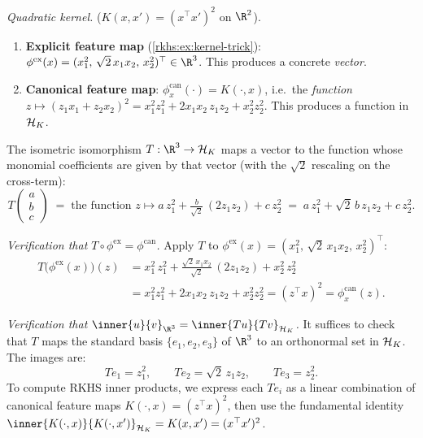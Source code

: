 \begin{notechapter}
\begin{intuition}
\medskip
\emph{Quadratic kernel.}
($K(x,x') = (x^\top x')^2$ on $\R^2$).
\begin{enumerate}
  \item \textbf{Explicit feature map}
    (\cref{rkhs:ex:kernel-trick}):
    $\phi^{\mathrm{ex}}(x) =
    (x_1^2,\, \sqrt{2}\,x_1 x_2,\, x_2^2)^\top
    \in \R^3$.
    This produces a concrete \emph{vector}.
  \item \textbf{Canonical feature map}:
    $\phi_x^{\mathrm{can}}(\cdot) = K(\cdot, x)$,
    i.e.\ the \emph{function}
    $z \mapsto (z_1 x_1 + z_2 x_2)^2
    = x_1^2 z_1^2 + 2x_1 x_2\, z_1 z_2
    + x_2^2 z_2^2$.
    This produces a function in $\mathcal{H}_K$.
\end{enumerate}
The isometric isomorphism $T: \R^3 \to \hk$ maps
a vector to the function whose monomial coefficients
are given by that vector (with the $\sqrt{2}$
rescaling on the cross-term):
\[
T\!\begin{pmatrix} a \\ b \\ c \end{pmatrix}
\;=\; \text{the function } z \mapsto
a\,z_1^2 + \tfrac{b}{\sqrt{2}}\,(2z_1 z_2)
+ c\,z_2^2
\;=\; a\,z_1^2 + \sqrt{2}\,b\, z_1 z_2
+ c\,z_2^2.
\]

\emph{Verification that
$T \circ \phi^{\mathrm{ex}} = \phi^{\mathrm{can}}$.}
Apply $T$ to $\phi^{\mathrm{ex}}(x) =
(x_1^2,\, \sqrt{2}\,x_1 x_2,\, x_2^2)^\top$:
\begin{align*}
T\!\bigl(\phi^{\mathrm{ex}}(x)\bigr)(z)
&= x_1^2\, z_1^2
+ \tfrac{\sqrt{2}\,x_1 x_2}{\sqrt{2}}\,(2z_1 z_2)
+ x_2^2\, z_2^2\\
&= x_1^2 z_1^2 + 2x_1 x_2\, z_1 z_2
+ x_2^2 z_2^2
= (z^\top x)^2 = \phi_x^{\mathrm{can}}(z).
\end{align*}

\emph{Verification that $\inner{u}{v}_{\R^3} =
\inner{Tu}{Tv}_{\hk}$.} It suffices to check that $T$
maps the standard basis $\{e_1, e_2, e_3\}$ of $\R^3$
to an orthonormal set in $\mathcal{H}_K$. The images are:
\[
Te_1 = z_1^2, \qquad
Te_2 = \sqrt{2}\,z_1 z_2, \qquad
Te_3 = z_2^2.
\]
To compute RKHS inner products, we express each $Te_i$
as a linear combination of canonical feature maps
$K(\cdot, x) = (z^\top x)^2$, then use the fundamental
identity
$\inner{K(\cdot,x)}{K(\cdot,x')}_{\hk} = K(x,x')
= (x^\top x')^2$.


\end{intuition}
\end{notechapter}
